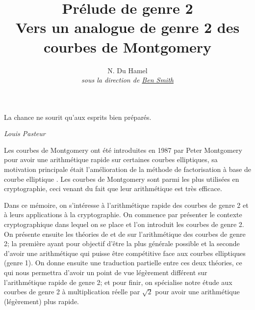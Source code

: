 \documentclass[a4paper,12pt]{article}
\theoremstyle{definition}
\theoremstyle{remark}
\numberwithin{equation}{section}
\begin{document}
\title{Prélude de genre 2 \\ \large{Vers un analogue de genre 2 des courbes de Montgomery}}
\author{N. Du Hamel%
\\
\emph{sous la direction de \href{http://www.lix.polytechnique.fr/~smith/}{Ben Smith}}}
\maketitle



\epigraph{La chance ne sourit qu'aux esprits bien préparés.}{\textit{Louis Pasteur}}

Les courbes de Montgomery ont été introduites en 1987 par Peter Montgomery pour avoir une arithmétique rapide sur certaines courbes elliptiques, sa motivation principale était l'amélioration de la méthode de factorisation à base de courbe elliptique \citep{montgomery}. Les courbes de Montgomery sont parmi les plus utilisées en cryptographie, ceci venant du fait que leur arithmétique est très efficace.

Dans ce mémoire, on s'intéresse à l'arithmétique rapide des courbes de genre 2 et à leurs applications à la cryptographie. On commence par présenter le contexte cryptographique dans lequel on se place et l'on introduit les courbes de genre 2. On présente ensuite les théories de \citet{cassels-Flynn} et de \citet{gaudry} sur l'arithmétique des courbes de genre 2; la première ayant pour objectif d'être la plus générale possible et la seconde d'avoir une arithmétique qui puisse être compétitive face aux courbes elliptiques (genre 1).
On donne ensuite une traduction partielle entre ces deux théories, ce qui nous permettra d'avoir un point de vue légèrement différent sur l'arithmétique rapide de genre 2; et pour finir, on spécialise notre étude aux courbes de genre 2 à multiplication réelle par $\sqrt{2}$ pour avoir une arithmétique (légèrement) plus rapide.
\end{document}
